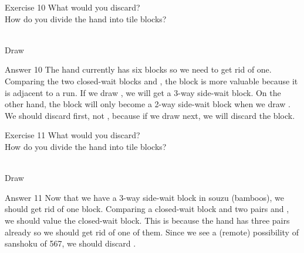 \vfill

\begin{itembox}[l]{Exercise 10}
What would you discard? \\
\vsp
How do you divide the hand into tile blocks? 

\bp
{}\bei\bei~\\
\hfill\footnotesize{Draw~~~~~~~~~~}
\ep
\end{itembox}

\newpage


\begin{itembox}[r]{Answer 10}
\emj
The hand currently has six blocks so we need to get rid of one. Comparing the two closed-wait blocks {\LARGE{}} and {\LARGE{}}, the {\LARGE{}} block is more valuable because it is adjacent to a run. If we draw {\LARGE{}}, we will get a 3-way side-wait block. On the other hand, the {\LARGE{}} block will only become a 2-way side-wait block when we draw {\LARGE{}}. We should discard {\LARGE{}} first, not {\LARGE{}}, because if we draw {\LARGE{}} next, we will discard the {\LARGE{}} block.
\end{itembox}

\vfill

\begin{itembox}[l]{Exercise 11}
What would you discard? \\
\vsp
How do you divide the hand into tile blocks? 

\bp
{}~\\
\hfill\footnotesize{Draw~~~~~~~~~~}
\ep
\end{itembox}

\newpage


\begin{itembox}[r]{Answer 11}
\emj
Now that we have a 3-way side-wait block in {\jap souzu} (bamboos), we should get rid of one block. Comparing a closed-wait block {\LARGE{}} and two pairs {\LARGE{}} and {\LARGE{}}, we should value the closed-wait block. This is because the hand has three pairs already so we should get rid of one of them. Since we see a (remote) possibility of {\jap sanshoku} of 567, we should discard {\LARGE{}}. 
\end{itembox}


